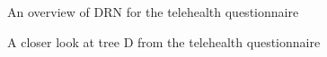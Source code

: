 \begin{figure}[]
    \noindent
    \caption{An overview of DRN for the telehealth questionnaire \label{Overview}}
\end{figure}

\begin{figure}[]
    \noindent
    \caption{A closer look at tree D from the telehealth questionnaire\label{DTree2}}
\end{figure}


